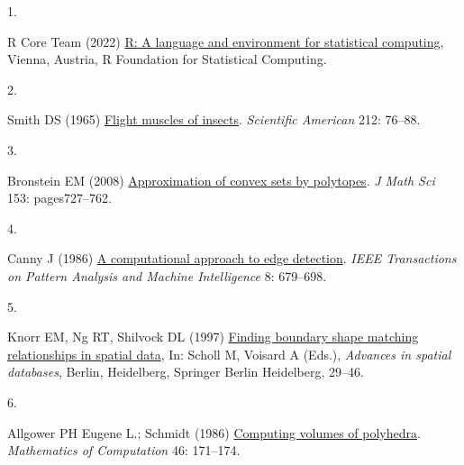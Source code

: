 \documentclass[
]{article}
\newlength{\cslhangindent}
\newlength{\csllabelwidth}
\newlength{\cslentryspacingunit} %
\newenvironment{CSLReferences}[2] %
 {%
  \setlength{\parindent}{0pt}
  \ifodd #1
  \let\oldpar\par
  \def\par{\hangindent=\cslhangindent\oldpar}
  \fi
  \setlength{\parskip}{#2\cslentryspacingunit}
 }%
 {}
\newcommand{\CSLLeftMargin}[1]{\parbox[t]{\csllabelwidth}{#1}}
\newcommand{\CSLRightInline}[1]{\parbox[t]{\linewidth - \csllabelwidth}{#1}\break}
\begin{document}
\hypertarget{refs}{}
\begin{CSLReferences}{0}{0}
\leavevmode{}%
\CSLLeftMargin{1. }
\CSLRightInline{R Core Team (2022) \href{https://www.R-project.org}{R: A
language and environment for statistical computing}, Vienna, Austria, R
Foundation for Statistical Computing.}

\leavevmode{}%
\CSLLeftMargin{2. }
\CSLRightInline{Smith DS (1965)
\href{https://doi.org/10.1242/jeb.204.23.4125}{Flight muscles of
insects}. \emph{Scientific American} 212: 76--88.}

\leavevmode{}%
\CSLLeftMargin{3. }
\CSLRightInline{Bronstein EM (2008)
\href{https://doi.org/10.1007/s10958-008-9144-x}{Approximation of convex
sets by polytopes}. \emph{J Math Sci} 153: pages727--762.}

\leavevmode{}%
\CSLLeftMargin{4. }
\CSLRightInline{Canny J (1986)
\href{http://citeseerx.ist.psu.edu/viewdoc/download?doi=10.1.1.420.3300\&rep=rep1\&type=pdf}{A
computational approach to edge detection}. \emph{IEEE Transactions on
Pattern Analysis and Machine Intelligence} 8: 679--698.}

\leavevmode{}%
\CSLLeftMargin{5. }
\CSLRightInline{Knorr EM, Ng RT, Shilvock DL (1997)
\href{https://doi.org/10.1007/3-540-63238-7_23}{Finding boundary shape
matching relationships in spatial data}, In: Scholl M, Voisard A (Eds.),
\emph{Advances in spatial databases}, Berlin, Heidelberg, Springer
Berlin Heidelberg, 29--46.}

\leavevmode{}%
\CSLLeftMargin{6. }
\CSLRightInline{Allgower PH Eugene L.; Schmidt (1986)
\href{https://doi.org/10.2307\%2F2008221}{Computing volumes of
polyhedra}. \emph{Mathematics of Computation} 46: 171--174.}

\end{CSLReferences}
\end{document}
